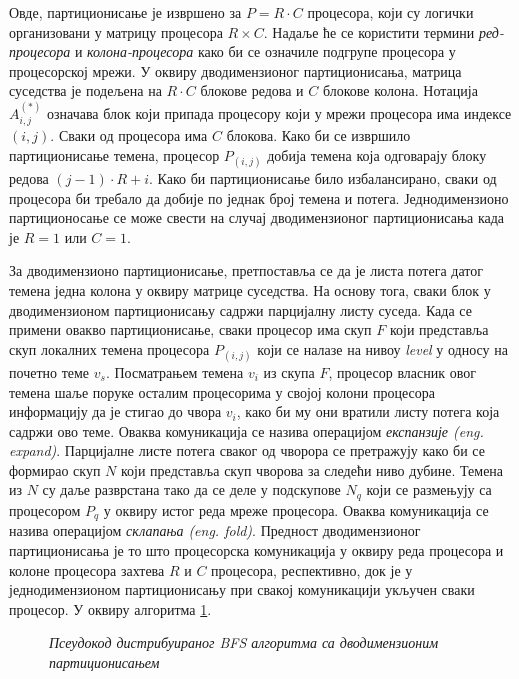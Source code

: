 \par
Овде, партиционисање је извршено за $P = R \cdot C$ процесора, који су логички организовани у матрицу процесора $R \times C$. Надаље ће се користити термини \textit{ред-процесора} и \textit{колона-процесора} како би се означиле подгрупе процесора у процесорској мрежи. У оквиру дводимензионог партиционисања, матрица суседства је подељена на $R \cdot C$ блокове редова и $C$ блокове колона. Нотација $A_{i, j}^{(*)}$ означава блок који припада процесору који у мрежи процесора има индексе $(i, j)$. Сваки од процесора има $C$ блокова. Како би се извршило партиционисање темена, процесор $P_{(i, j)}$ добија темена која одговарају блоку редова $(j - 1) \cdot R + i$. Како би партиционисање било избалансирано, сваки од процесора би требало да добије по једнак број темена и потега. Једнодимензионо партиционосање се може свести на случај дводимензионог партиционисања када је $R = 1$ или $C = 1$.

\par
За дводимензионо партиционисање, претпоставља се да је листа потега датог темена једна колона у оквиру матрице суседства. На основу тога, сваки блок у дводимензионом партиционисању садржи парцијалну листу суседа. Када се примени овакво партиционисање, сваки процесор има скуп $F$ који представља скуп локалних темена процесора $P_{(i,j)}$ који се налазе на нивоу \textit{level} у односу на почетно теме $v_s$. Посматрањем темена $v_i$ из скупа $F$, процесор власник овог темена шаље поруке осталим процесорима у својој колони процесора информацију да је стигао до чвора $v_i$, како би му они вратили листу потега која садржи ово теме. Оваква комуникација се назива операцијом \textit{експанзије (eng. expand)}. Парцијалне листе потега сваког од чворора се претражују како би се формирао скуп $N$ који представља скуп чворова за следећи ниво дубине. Темена из $N$ су даље разврстана тако да се деле у подскупове $N_q$ који се размењују са процесором $P_q$ у оквиру истог реда мреже процесора. Оваква комуникација се назива операцијом \textit{склапања (eng. fold)}. Предност дводимензионог партиционисања је то што процесорска комуникација у оквиру реда процесора и колоне процесора захтева $R$ и $C$ процесора, респективно, док је у једнодимензионом партиционисању при свакој комуникацији укључен сваки процесор. У оквиру алгоритма \ref{pseudocode:algorithm-bfs-distance-2D-par-pseudo}.

\begin{figure}[!ht]
    \centering
    
    \caption{\textit{Псеудокод дистрибуираног BFS алгоритма са дводимензионим партиционисањем}}
    \label{pseudocode:algorithm-bfs-distance-2D-par-pseudo}
\end{figure}

